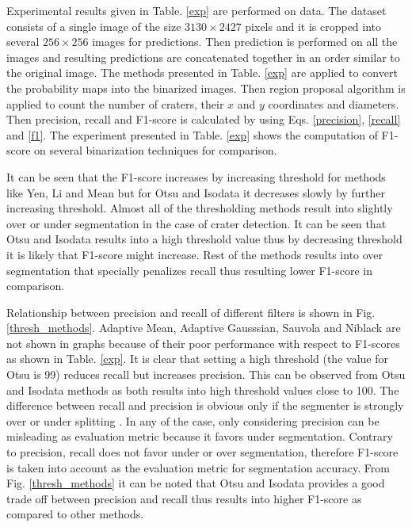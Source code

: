 \documentclass[11pt]{article}
\begin{document}
Experimental results given in Table. \ref{exp} are performed on \cite{dino2020} data. The dataset consists of a single image of the size $3130 \times 2427$ pixels and it is cropped into several $256 \times 256$ images for predictions. Then prediction is performed on all the images and resulting predictions are concatenated together in an order similar to the original image. The methods presented in Table. \ref{exp} are applied to convert the probability maps into the binarized images. Then region proposal algorithm is applied to count the number of craters, their $x$ and $y$ coordinates and diameters. Then precision, recall and F1-score is calculated by using Eqs. \ref{precision}, \ref{recall} and \ref{f1}. The experiment presented in Table. \ref{exp} shows the computation of F1-score on several binarization techniques for comparison.

It can be seen that the F1-score increases by increasing threshold for methods like Yen, Li and Mean but for Otsu and Isodata it decreases slowly by further increasing threshold. Almost all of the thresholding methods result into slightly over or under segmentation in the case of crater detection. It can be seen that Otsu and Isodata results into a high threshold value thus by decreasing threshold it is likely that F1-score might increase. Rest of the methods results into over segmentation that specially penalizes recall thus resulting lower F1-score in comparison.

Relationship between precision and recall of different filters is shown in Fig. \ref{thresh_methods}. Adaptive Mean, Adaptive Gausssian, Sauvola and Niblack are not shown in graphs because of their poor performance with respect to F1-scores as shown in Table. \ref{exp}. It is clear that setting a high threshold (the value for Otsu is 99) reduces recall but increases precision. This can be observed from Otsu and Isodata methods as both results into high threshold values close to 100. The difference between recall and  precision is obvious only if the segmenter is strongly over or under splitting \cite{badrinarayanan2017segnet}. In any of the case, only considering precision can be misleading as evaluation metric because it favors under segmentation. Contrary to precision, recall does not favor under or over segmentation, therefore F1-score is taken into account as the evaluation metric for segmentation accuracy. From Fig. \ref{thresh_methods} it can be noted that Otsu and Isodata provides a good trade off between precision and recall thus results into higher F1-score as compared to other methods.
 
\end{document}

